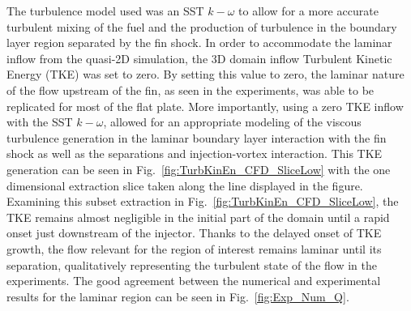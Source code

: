 \documentclass{AIAA}
\begin{document}
The turbulence model used was an SST $k-\omega$ to allow for a more accurate turbulent mixing of the fuel and the production of turbulence in the boundary layer region separated by the fin shock.
In order to accommodate the laminar inflow from the quasi-2D simulation, the 3D domain inflow Turbulent Kinetic Energy (TKE) was set to zero.
By setting this value to zero, the laminar nature of the flow upstream of the fin, as seen in the experiments, was able to be replicated for most of the flat plate.
More importantly, using a zero TKE inflow with the SST $k-\omega$, allowed for an appropriate modeling of the viscous turbulence generation in the laminar boundary layer interaction with the fin shock as well as the separations and injection-vortex interaction.
This TKE generation can be seen in Fig.~\ref{fig:TurbKinEn_CFD_SliceLow} with the one dimensional extraction slice taken along the line displayed in the figure.
Examining this subset extraction in Fig.~\ref{fig:TurbKinEn_CFD_SliceLow}, the TKE remains almost negligible in the initial part of the domain until a rapid onset just downstream of the injector.
Thanks to the delayed onset of TKE growth, the flow relevant for the region of interest remains laminar until its separation, qualitatively representing the turbulent state of the flow in the experiments.
The good agreement between the numerical and experimental results for the laminar region can be seen in Fig.~\ref{fig:Exp_Num_Q}.
\end{document}
